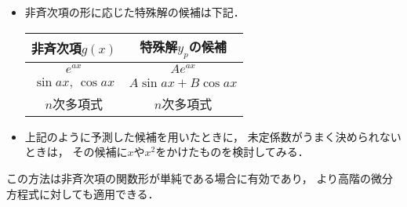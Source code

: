 \begin{itemize}
  \item 非斉次項の形に応じた特殊解の候補は下記． 
  \begin{table}[htbp]
  \centering
  \begin{tabular}{cc}
  \hline
  \hline
  非斉次項$g\left(x\right)$ & 特殊解$y_{p}$の候補\tabularnewline
  \hline 
  $e^{ax}$ & $Ae^{ax}$\tabularnewline
  $\sin ax,\,\cos ax$ & $A\sin ax+B\cos ax$\tabularnewline
  $n$次多項式 & $n$次多項式\tabularnewline
  \hline 
  \end{tabular}
  \end{table}
  \item 上記のように予測した候補を用いたときに，
	未定係数がうまく決められないときは，
	その候補に$x$や$x^2$をかけたものを検討してみる．
\end{itemize}
この方法は非斉次項の関数形が単純である場合に有効であり，
より高階の微分方程式に対しても適用できる．
%
%